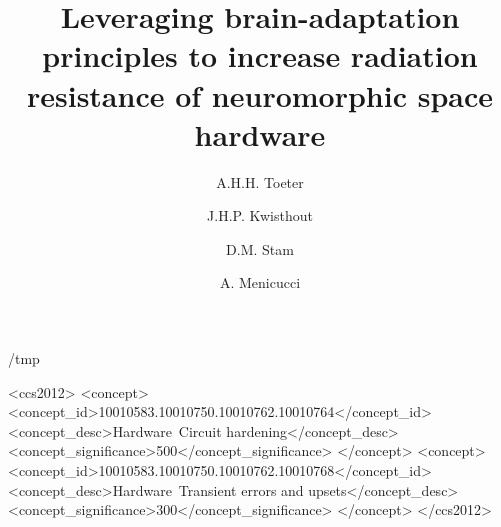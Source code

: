 \documentclass[sigconf]{acmart}
\def\overleafhome{/tmp}%
\begin{document}
\title{Leveraging brain-adaptation principles to increase radiation resistance of neuromorphic space hardware}

\author{A.H.H. Toeter}


\author{J.H.P. Kwisthout}

\author{D.M. Stam}

\author{A. Menicucci}

\renewcommand{\shortauthors}{Toeter et al.}

\ifx\homepath\overleafhome
  
\else
  
\fi


\begin{CCSXML}
  <ccs2012>
    <concept>
        <concept_id>10010583.10010750.10010762.10010764</concept_id>
        <concept_desc>Hardware~Circuit hardening</concept_desc>
        <concept_significance>500</concept_significance>
        </concept>
    <concept>
        <concept_id>10010583.10010750.10010762.10010768</concept_id>
        <concept_desc>Hardware~Transient errors and upsets</concept_desc>
        <concept_significance>300</concept_significance>
        </concept>
  </ccs2012>
\end{CCSXML}
\end{document}
